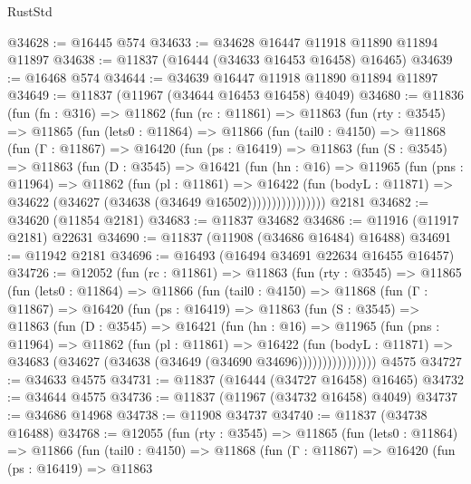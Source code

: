 \begin{lexlean}{RustStd}
\begin{coremodule}
{\begin{coremodule}
{{{{{{{{{{{{{{{{{{{{{{{{{{{{{{{{{{{{{{{{{{{{{{{{{{@34628 := @16445 @574
@34633 := @34628 @16447 @11918 @11890 @11894 @11897
@34638 := @11837 (@16444 (@34633 @16453 @16458) @16465)
@34639 := @16468 @574
@34644 := @34639 @16447 @11918 @11890 @11894 @11897
@34649 := @11837 (@11967 (@34644 @16453 @16458) @4049)
@34680 := @11836
    (fun (fn : @316) =>
    @11862
      (fun (rc : @11861) =>
      @11863
        (fun (rty : @3545) =>
        @11865
          (fun (lets0 : @11864) =>
          @11866
            (fun (tail0 : @4150) =>
            @11868
              (fun (Γ : @11867) =>
              @16420
                (fun (ps : @16419) =>
                @11863
                  (fun (S : @3545) =>
                  @11863
                    (fun (D : @3545) =>
                    @16421
                      (fun (hn : @16) =>
                      @11965
                        (fun (pns : @11964) =>
                        @11862
                          (fun (pl : @11861) =>
                          @16422
                            (fun (bodyL : @11871) =>
                            @34622 (@34627 (@34638 (@34649 @16502))))))))))))))))
    @2181
@34682 := @34620 (@11854 @2181)
@34683 := @11837 @34682
@34686 := @11916 (@11917 @2181) @22631
@34690 := @11837 (@11908 (@34686 @16484) @16488)
@34691 := @11942 @2181
@34696 := @16493 (@16494 @34691 @22634 @16455 @16457)
@34726 := @12052
    (fun (rc : @11861) =>
    @11863
      (fun (rty : @3545) =>
      @11865
        (fun (lets0 : @11864) =>
        @11866
          (fun (tail0 : @4150) =>
          @11868
            (fun (Γ : @11867) =>
            @16420
              (fun (ps : @16419) =>
              @11863
                (fun (S : @3545) =>
                @11863
                  (fun (D : @3545) =>
                  @16421
                    (fun (hn : @16) =>
                    @11965
                      (fun (pns : @11964) =>
                      @11862
                        (fun (pl : @11861) =>
                        @16422
                          (fun (bodyL : @11871) =>
                          @34683 (@34627 (@34638 (@34649 (@34690 @34696))))))))))))))))
    @4575
@34727 := @34633 @4575
@34731 := @11837 (@16444 (@34727 @16458) @16465)
@34732 := @34644 @4575
@34736 := @11837 (@11967 (@34732 @16458) @4049)
@34737 := @34686 @14968
@34738 := @11908 @34737
@34740 := @11837 (@34738 @16488)
@34768 := @12055
    (fun (rty : @3545) =>
    @11865
      (fun (lets0 : @11864) =>
      @11866
        (fun (tail0 : @4150) =>
        @11868
          (fun (Γ : @11867) =>
          @16420
            (fun (ps : @16419) =>
            @11863
}}}}}}}}}}}}}}}}}}}}}}}}}}}}}}}}}}}}}}}}}}}}}}}}}}
\end{coremodule}}
\end{coremodule}
\end{lexlean}
